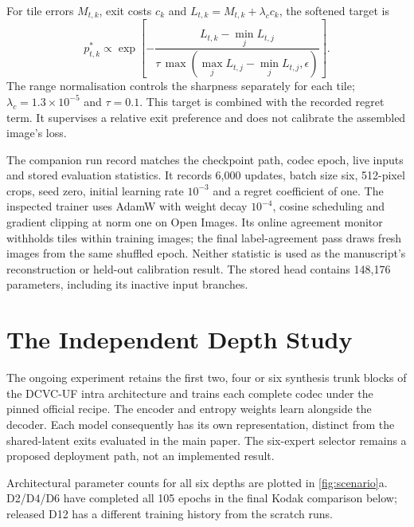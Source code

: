 For tile errors $M_{t,k}$, exit costs $c_k$ and
$L_{t,k}=M_{t,k}+\lambda_c c_k$, the softened target is
\begin{equation}
 p^*_{t,k}\propto\exp\!\left[-\frac{L_{t,k}-\min_j L_{t,j}}
 {\tau\,\max(\max_j L_{t,j}-\min_j L_{t,j},\epsilon)}\right].
 \label{eq:softtarget}
\end{equation}
The range normalisation controls the sharpness separately for each tile;
$\lambda_c=1.3\times10^{-5}$ and $\tau=0.1$. This target is combined with
the recorded regret term. It supervises a relative exit preference and
does not calibrate the assembled image's loss.

The companion run record matches the checkpoint path, codec epoch, live
inputs and stored evaluation statistics. It records 6,000 updates, batch
size six, 512-pixel crops, seed zero, initial learning rate $10^{-3}$ and a
regret coefficient of one. The inspected trainer uses AdamW with weight
decay $10^{-4}$, cosine scheduling and gradient clipping at norm one on
Open Images. Its online agreement monitor withholds tiles within training
images; the final label-agreement pass draws fresh images from the same
shuffled epoch. Neither statistic is used as the manuscript's reconstruction
or held-out calibration result. The stored head contains 148,176 parameters,
including its inactive input branches.

\section{The Independent Depth Study}

The ongoing experiment retains the first two, four or six synthesis trunk
blocks of the DCVC-UF intra architecture and trains each complete codec
under the pinned official recipe. The encoder and entropy weights learn
alongside the decoder. Each model consequently has its own representation,
distinct from the shared-latent exits evaluated in the main paper.
The six-expert selector remains a proposed deployment path, not an
implemented result.

Architectural parameter counts for all six depths are plotted in
\cref{fig:scenario}a. D2/D4/D6 have completed all 105 epochs in the
final Kodak comparison below; released D12 has a different training
history from the scratch runs.

